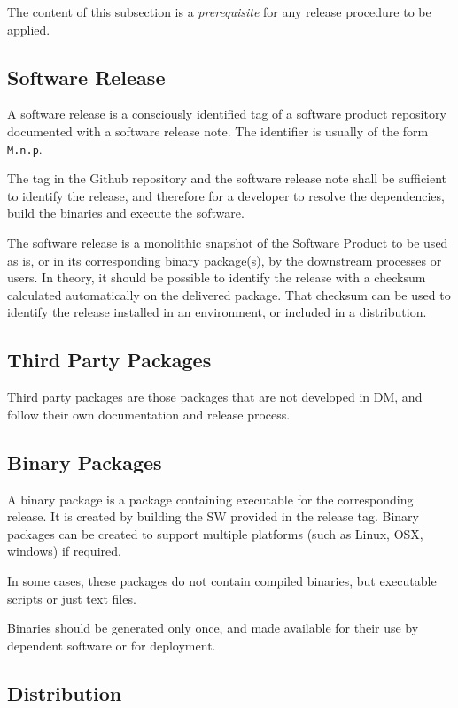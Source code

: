 The content of this subsection is a \textit{prerequisite} for any release procedure to be applied.


\subsection{Software Release} \label{sec:defrelease}

A software release is a consciously identified tag of a software product repository documented with a software release note.
The identifier is usually of the form \texttt{M.n.p}.

The tag in the Github repository and the software release note shall be sufficient to identify the release, and therefore for a developer
to resolve the dependencies, build the binaries and execute the software.

The software release is a monolithic snapshot of the Software Product to be used as is, or in its corresponding binary package(s), by the downstream processes or users.
In theory, it should be possible to identify the release with a checksum calculated automatically on the delivered package.
That checksum can be used to identify the release installed in an environment, or included in a distribution.


\subsection{Third Party Packages}

Third party packages are those packages that are not developed in \gls{DM}, and follow their own documentation and release process.


\subsection{Binary Packages} \label{sec:swbpkg}

A binary package is a package containing executable for the corresponding release.
It is created by building the \gls{SW} provided in the release tag.
Binary packages can be created to support multiple platforms (such as Linux, \gls{OSX}, windows) if required.

In some cases, these packages do not contain compiled binaries, but executable scripts or just text files.

Binaries should be generated only once, and made available for their use by dependent software or for deployment.


\subsection{Distribution} \label{sec:distribution}

